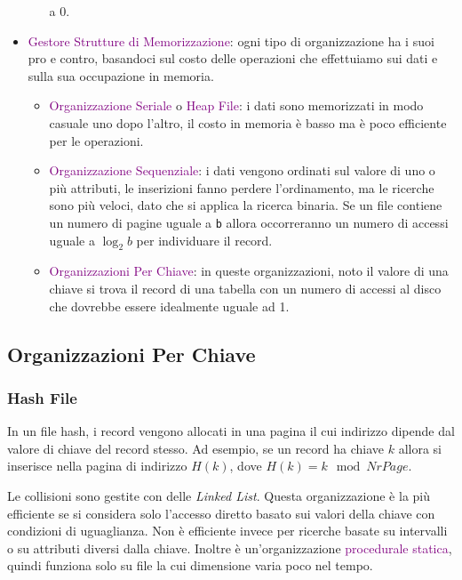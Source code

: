 \begin{itemize}
\begin{itemize}
                a 0.
        \end{itemize}
    \item \textcolor{purple}{Gestore Strutture di Memorizzazione}: ogni tipo di organizzazione ha i suoi
        pro e contro, basandoci sul costo delle operazioni che effettuiamo sui dati e sulla sua occupazione
        in memoria.
        \begin{itemize}
            \item \textcolor{purple}{Organizzazione Seriale} o \textcolor{purple}{Heap File}: i dati sono memorizzati
                in modo casuale uno dopo l'altro, il costo in memoria è basso ma è poco efficiente per le operazioni.
            \item \textcolor{purple}{Organizzazione Sequenziale}: i dati vengono ordinati sul valore di uno o più attributi,
                le inserizioni fanno perdere l'ordinamento, ma le ricerche sono più veloci, dato che si applica la ricerca
                binaria. Se un file contiene un numero di pagine uguale a \verb|b| allora occorreranno un numero di accessi
                uguale a $\log_{2}{b}$ per individuare il record.
            \item \textcolor{purple}{Organizzazioni Per Chiave}: in queste organizzazioni, noto il valore di una
                chiave si trova il record di una tabella con un numero di accessi al disco che dovrebbe essere
                idealmente uguale ad 1.
        \end{itemize}
\end{itemize}

\subsection{Organizzazioni Per Chiave}

\subsubsection{Hash File}
In un file hash, i record vengono allocati in una pagina il cui indirizzo dipende dal
valore di chiave del record stesso. Ad esempio, se un record ha chiave $k$ allora si inserisce
nella pagina di indirizzo $H(k)$, dove $H(k) = k \mod NrPage$.

Le collisioni sono gestite con delle \emph{Linked List}. Questa organizzazione è la più
efficiente se si considera solo l'accesso diretto basato sui valori della chiave con condizioni
di uguaglianza. Non è efficiente invece per ricerche basate su intervalli o su attributi diversi dalla
chiave. Inoltre è un'organizzazione \textcolor{purple}{procedurale statica}, quindi funziona solo
su file la cui dimensione varia poco nel tempo.


